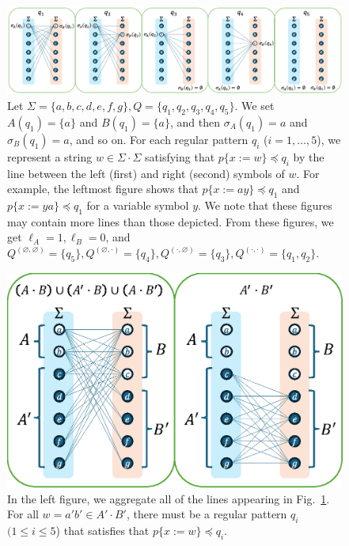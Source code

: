 \begin{figure}[t]
  \begin{center}
    \includegraphics[scale=0.5]{figs/lem8eachreg.eps}
    \caption{Let $\Sigma=\{a,b,c,d,e,f,g\}, Q=\{q_1,q_2,q_3,q_4,q_5\}$. We set $A(q_1)=\{a\}$ and $B(q_1)=\{a\}$, and then $\sigma_A(q_1)=a$ and $\sigma_B(q_1)=a$, and so on. For each regular pattern $q_i$ ($i=1,\ldots,5$), we represent a string $w \in \Sigma\cdot\Sigma$ satisfying that $p\{x:=w\}\preceq q_i$ by the line between the left (first) and right (second) symbols of $w$. For example, the leftmost figure shows that $p\{x:=ay\}\preceq q_1$ and $p\{x:=ya\}\preceq q_1$ for a variable symbol $y$. We note that these figures may contain more lines than those depicted. From these figures, we get $\ell_A=1, \ell_B=0$, and $Q^{(\varnothing,\varnothing)}=\{q_5\}, Q^{(\varnothing,\cdot)}=\{q_4\}, Q^{(\cdot,\varnothing)}=\{q_3\}, Q^{(\cdot,\cdot)}=\{q_1,q_2\}$.}\label{fig:lem8eachreg}
  \end{center}
\end{figure}

\begin{figure}[t]
  \begin{center}
    \includegraphics[scale=0.5]{figs/lem8totalreg.eps}
    \caption{In the left figure, we aggregate all of the lines appearing in Fig.~\ref{fig:lem8eachreg}. For all $w=a'b'\in A'\cdot B'$, there must be a regular pattern $q_i$ $(1\leq i\leq 5$) that satisfies that $p \{ x:=w \} \preceq q_i$.}\label{fig:lem8totalreg}
  \end{center}
\end{figure}

